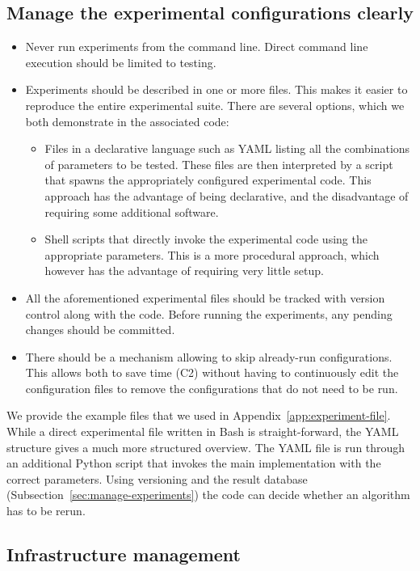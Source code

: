 \documentclass{llncs}
\begin{document}
\subsection{Manage the experimental configurations clearly}

\begin{itemize}
\item Never run experiments from the command line. Direct command line execution
  should be limited to testing.
\item Experiments should be described in one or more files. This makes it easier
  to reproduce the entire experimental suite. There are several options, which we both 
  demonstrate in the associated code:
  \begin{itemize}
    \item Files in a declarative language such as YAML listing all the combinations of
    parameters to be tested. These files are then interpreted by a script that spawns
    the appropriately configured experimental code. This approach has the advantage of
    being declarative, and the disadvantage of requiring some additional software.
    \item Shell scripts that directly invoke the experimental code using 
      the appropriate parameters. This is a more procedural approach, which however has
      the advantage of requiring very little setup.
  \end{itemize}
\item All the aforementioned experimental files should be tracked with version 
  control along with the code. Before running the experiments, any pending changes should be committed.
\item There should be a mechanism allowing to skip already-run configurations.
  This allows both to save time (C2) without having to continuously edit
  the configuration files to remove the configurations that do not need to be run.
\end{itemize}
%
We provide the example files that we used in Appendix~\ref{app:experiment-file}. While a direct experimental file written in Bash is straight-forward, the YAML structure gives a much more structured overview. The YAML file is run through an additional Python script that invokes the main implementation with the correct parameters. Using versioning and the result database (Subsection~\ref{sec:manage-experiments}) the code can decide whether an algorithm has to be rerun.

\subsection{Infrastructure management}
\end{document}
